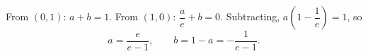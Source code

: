 From $(0,1)$: $a+b=1$. From $(1,0)$: $\dfrac ae+b=0$. Subtracting, $a\left(1-\dfrac1e\right)=1$, so
\[a=\boxed{\dfrac{e}{e-1}},\qquad b=1-a=\boxed{-\dfrac{1}{e-1}}.\]
